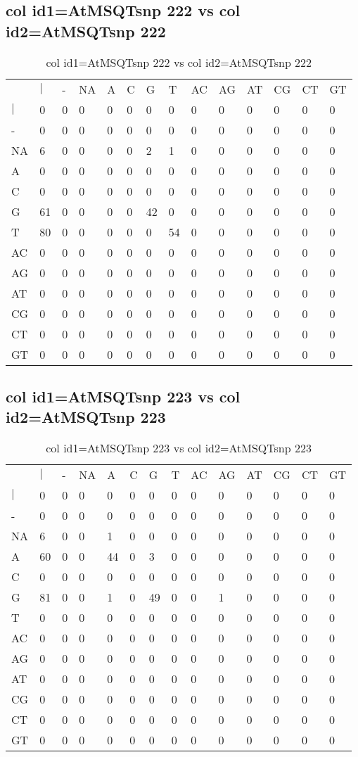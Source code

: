\subsection{col id1=AtMSQTsnp 222 vs col id2=AtMSQTsnp 222}
\begin{center}
\begin{longtable}{|l|l|l|l|l|l|l|l|l|l|l|l|l|l|}
\caption{col id1=AtMSQTsnp 222 vs col id2=AtMSQTsnp 222} \label{table_dm592}\\
\hline
\\
\hline
&$|$&-&NA&A&C&G&T&AC&AG&AT&CG&CT&GT\\
$|$&0&0&0&0&0&0&0&0&0&0&0&0&0\\
-&0&0&0&0&0&0&0&0&0&0&0&0&0\\
NA&6&0&0&0&0&2&1&0&0&0&0&0&0\\
A&0&0&0&0&0&0&0&0&0&0&0&0&0\\
C&0&0&0&0&0&0&0&0&0&0&0&0&0\\
G&61&0&0&0&0&42&0&0&0&0&0&0&0\\
T&80&0&0&0&0&0&54&0&0&0&0&0&0\\
AC&0&0&0&0&0&0&0&0&0&0&0&0&0\\
AG&0&0&0&0&0&0&0&0&0&0&0&0&0\\
AT&0&0&0&0&0&0&0&0&0&0&0&0&0\\
CG&0&0&0&0&0&0&0&0&0&0&0&0&0\\
CT&0&0&0&0&0&0&0&0&0&0&0&0&0\\
GT&0&0&0&0&0&0&0&0&0&0&0&0&0\\
\hline
\end{longtable}
\end{center}

\subsection{col id1=AtMSQTsnp 223 vs col id2=AtMSQTsnp 223}
\begin{center}
\begin{longtable}{|l|l|l|l|l|l|l|l|l|l|l|l|l|l|}
\caption{col id1=AtMSQTsnp 223 vs col id2=AtMSQTsnp 223} \label{table_dm594}\\
\hline
\\
\hline
&$|$&-&NA&A&C&G&T&AC&AG&AT&CG&CT&GT\\
$|$&0&0&0&0&0&0&0&0&0&0&0&0&0\\
-&0&0&0&0&0&0&0&0&0&0&0&0&0\\
NA&6&0&0&1&0&0&0&0&0&0&0&0&0\\
A&60&0&0&44&0&3&0&0&0&0&0&0&0\\
C&0&0&0&0&0&0&0&0&0&0&0&0&0\\
G&81&0&0&1&0&49&0&0&1&0&0&0&0\\
T&0&0&0&0&0&0&0&0&0&0&0&0&0\\
AC&0&0&0&0&0&0&0&0&0&0&0&0&0\\
AG&0&0&0&0&0&0&0&0&0&0&0&0&0\\
AT&0&0&0&0&0&0&0&0&0&0&0&0&0\\
CG&0&0&0&0&0&0&0&0&0&0&0&0&0\\
CT&0&0&0&0&0&0&0&0&0&0&0&0&0\\
GT&0&0&0&0&0&0&0&0&0&0&0&0&0\\
\hline
\end{longtable}
\end{center}

